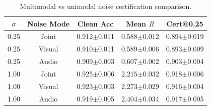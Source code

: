 \begin{table}[t]
\centering
\caption{Multimodal vs unimodal noise certification comparison.}
\label{tab:ablation}
\begin{tabular}{cc|ccc}
\toprule
$\sigma$ & Noise Mode & Clean Acc & Mean $R$ & Cert@0.25 \\
\midrule
0.25 & Joint & 0.912\tiny{$\pm$0.011} & 0.588\tiny{$\pm$0.012} & 0.894\tiny{$\pm$0.019} \\
0.25 & Visual & 0.910\tiny{$\pm$0.011} & 0.589\tiny{$\pm$0.006} & 0.893\tiny{$\pm$0.009} \\
0.25 & Audio & 0.909\tiny{$\pm$0.003} & 0.607\tiny{$\pm$0.002} & 0.903\tiny{$\pm$0.004} \\
\midrule
1.00 & Joint & 0.925\tiny{$\pm$0.006} & 2.215\tiny{$\pm$0.032} & 0.918\tiny{$\pm$0.006} \\
1.00 & Visual & 0.923\tiny{$\pm$0.003} & 2.273\tiny{$\pm$0.029} & 0.916\tiny{$\pm$0.004} \\
1.00 & Audio & 0.919\tiny{$\pm$0.005} & 2.404\tiny{$\pm$0.034} & 0.917\tiny{$\pm$0.005} \\
\bottomrule
\end{tabular}
\end{table}
